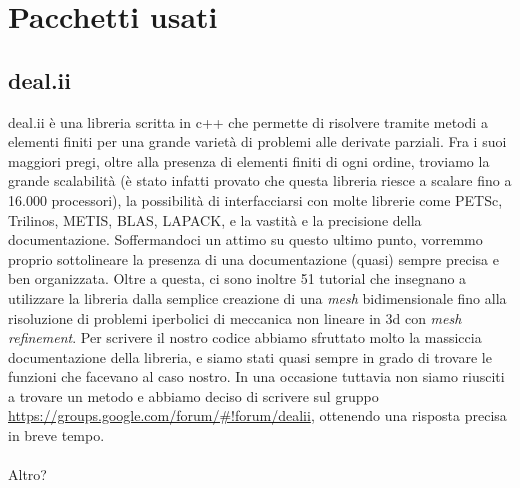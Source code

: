 \documentclass[a4paper,10pt]{report}
\theoremstyle{plain}
\theoremstyle{definition}
\theoremstyle{remark}
\begin{document}
\chapter{Pacchetti usati}
\section{\textsf{deal.ii}}
\textsf{deal.ii} \`e una libreria scritta in c++ che permette di risolvere tramite metodi a elementi finiti per una grande variet\`a di problemi alle derivate parziali. Fra i suoi maggiori pregi, oltre alla presenza di elementi finiti di ogni ordine, troviamo la grande scalabilit\`a (\`e stato infatti provato che questa libreria riesce a scalare fino a 16.000 processori), la possibilit\`a di interfacciarsi con molte librerie come \textsf{PETSc}, \textsf{Trilinos}, \textsf{METIS}, \textsf{BLAS}, \textsf{LAPACK}, e la vastit\`a e la precisione della documentazione. Soffermandoci un attimo su questo ultimo punto, vorremmo proprio sottolineare la presenza di una documentazione (quasi) sempre precisa e ben organizzata. Oltre a questa, ci sono inoltre 51 tutorial che insegnano a utilizzare la libreria dalla semplice creazione di una \emph{mesh} bidimensionale fino alla risoluzione di problemi iperbolici di meccanica non lineare in 3d con \emph{mesh refinement}. Per scrivere il nostro codice abbiamo sfruttato molto la massiccia documentazione della libreria, e siamo stati quasi sempre in grado di trovare le funzioni che facevano al caso nostro. In una occasione tuttavia non siamo riusciti a trovare un metodo e abbiamo deciso di scrivere sul gruppo \url{https://groups.google.com/forum/#!forum/dealii}, ottenendo una risposta precisa in breve tempo.\\\\Altro?
\end{document}

